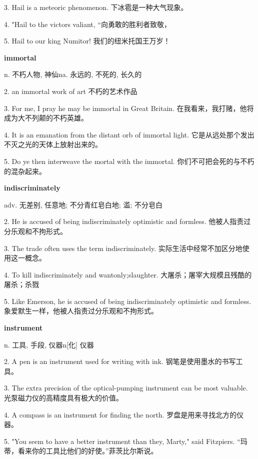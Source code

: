 \documentclass[12pt]{book}
\begin{document}
3.  Hail is a meteoric phenomenon.  下冰雹是一种大气现象。 


4.  "Hail to the victors valiant,  “向勇敢的胜利者致敬， 


5.  Hail to our king Numitor!  我们的纽米托国王万岁！ 


\vspace{12pt}

\textbf{immortal}

n. 不朽人物, 神仙na. 永远的, 不死的, 长久的

2.  an immortal work of art  不朽的艺术作品 


3.  For me, I pray he may be immortal in Great Britain.  在我看来，我打赌，他将成为大不列颠的不朽英雄。 


4.  It is an emanation from the distant orb of immortal light.  它是从远处那个发出不灭之光的天体上放射出来的。 


5.  Do ye then interweave the mortal with the immortal.  你们不可把会死的与不朽的混杂起来。 


\vspace{12pt}

\textbf{indiscriminately}

adv. 无差别, 任意地; 不分青红皂白地; 滥; 不分皂白

2.  He is accused of being indiscriminately optimistic and formless.  他被人指责过分乐观和不拘形式。 


3.  The trade often uses the term indiscriminately.  实际生活中经常不加区分地使用这一概念。 


4.  To kill indiscriminately and wantonly;slaughter.  大屠杀；屠宰大规模且残酷的屠杀；杀戮 


5.  Like Emerson, he is accused of being indiscriminately optimistic and formless.  象爱默生一样，他被人指责过分乐观和不拘形式。 


\vspace{12pt}

\textbf{instrument}

n. 工具, 手段, 仪器n[化] 仪器

2.  A pen is an instrument used for writing with ink.  钢笔是使用墨水的书写工具。 


3.  The extra precision of the optical-pumping instrument can be most valuable.  光泵磁力仪的高精度具有极大的价值。 


4.  A compass is an instrument for finding the north.  罗盘是用来寻找北方的仪器。 


5.  "You seem to have a better instrument than they, Marty," said Fitzpiers.  “玛蒂，看来你的工具比他们的好使。”菲茨比尔斯说。 
\end{document}
